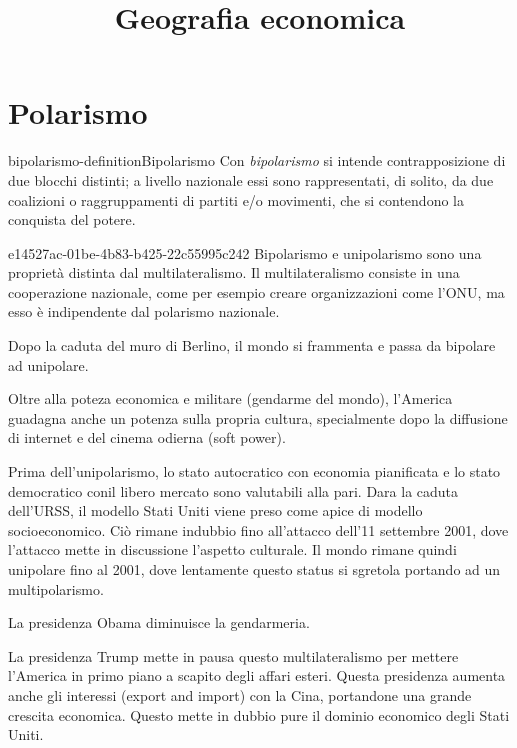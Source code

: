 \documentclass[preview]{standalone}
\begin{document}
\title{Geografia economica}
\genpage

\section{Polarismo}

\begin{snippetdefinition}{bipolarismo-definition}{Bipolarismo}
    Con \textit{bipolarismo} si intende contrapposizione di due blocchi distinti;
    a livello nazionale essi sono rappresentati, di solito, da due coalizioni o
    raggruppamenti di partiti e/o movimenti, che si contendono la conquista del potere.
\end{snippetdefinition}

\begin{snippet}{e14527ac-01be-4b83-b425-22c55995c242}
    Bipolarismo e unipolarismo sono una proprietà distinta dal multilateralismo.
    Il multilateralismo consiste in una cooperazione nazionale, come per esempio creare organizzazioni
    come l'ONU, ma esso è indipendente dal polarismo nazionale.

    Dopo la caduta del muro di Berlino, il mondo si frammenta e passa da bipolare ad unipolare.

    Oltre alla poteza economica e militare (gendarme del mondo), l'America
    guadagna anche un potenza sulla propria cultura, specialmente dopo la diffusione di internet
    e del cinema odierna (soft power).

    Prima dell'unipolarismo, lo stato autocratico con economia pianificata e
    lo stato democratico conil libero mercato sono valutabili alla pari.
    Dara la caduta dell'URSS, il modello Stati Uniti viene preso come apice
    di modello socioeconomico.
    Ciò rimane indubbio fino all'attacco dell'11 settembre 2001, dove l'attacco mette
    in discussione l'aspetto culturale.
    Il mondo rimane quindi unipolare fino al 2001, dove lentamente questo status si sgretola
    portando ad un multipolarismo.

    La presidenza Obama diminuisce la gendarmeria.

    La presidenza Trump mette in pausa questo multilateralismo per mettere l'America
    in primo piano a scapito degli affari esteri.
    Questa presidenza aumenta anche gli interessi (export and import) con la Cina, portandone
    una grande crescita economica. Questo mette in dubbio pure
    il dominio economico degli Stati Uniti.
\end{snippet}
\end{document}
